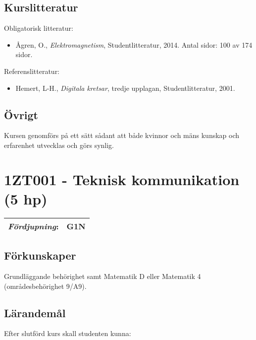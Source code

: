 \subsection*{Kurslitteratur}

Obligatorisk litteratur:

\begin{itemize}
\tightlist
\item
  Ågren, O., \emph{Elektromagnetism}, Studentlitteratur, 2014. Antal
  sidor: 100 av 174 sidor.
\end{itemize}

Referenslitteratur:

\begin{itemize}
\tightlist
\item
  Hemert, L-H., \emph{Digitala kretsar}, tredje upplagan,
  Studentlitteratur, 2001.
\end{itemize}

\subsection*{Övrigt}

Kursen genomförs på ett sätt sådant att både kvinnor och mäns kunskap och erfarenhet utvecklas och görs synlig.
\pagebreak
\section*{1ZT001 - Teknisk kommunikation (5 hp)}

\begin{tabular}{ll}
\emph{Fördjupning}: & G1N\tabularnewline
\bottomrule
\end{tabular}

\subsection*{Förkunskaper}

Grundläggande behörighet samt Matematik D eller Matematik 4
(områdesbehörighet 9/A9).

\subsection*{Lärandemål}

Efter slutförd kurs skall studenten kunna:

